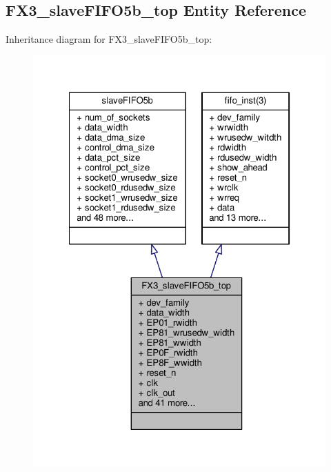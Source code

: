 \subsection{F\+X3\+\_\+slave\+F\+I\+F\+O5b\+\_\+top Entity Reference}
\label{classFX3__slaveFIFO5b__top}


Inheritance diagram for F\+X3\+\_\+slave\+F\+I\+F\+O5b\+\_\+top\+:\nopagebreak
\begin{figure}[H]
\begin{center}
\leavevmode
\includegraphics[width=322pt]{de/dec/classFX3__slaveFIFO5b__top__inherit__graph}
\end{center}
\end{figure}


